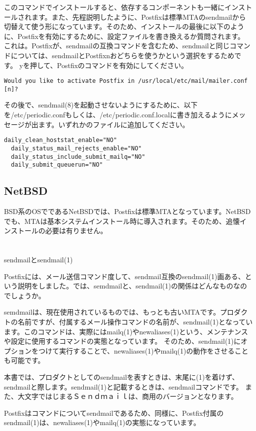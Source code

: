 このコマンドでインストールすると、依存するコンポーネントも一緒にインストールされます。また、先程説明したように、Postfixは標準MTAのsendmailから切替えて使う形になっています。そのため、インストールの最後に以下のように、Postfixを有効にするために、設定ファイルを書き換えるか質問されます。
これは。Postfixが、sendmailの互換コマンドを含むため、sendmailと同じコマンドについては、sendmailとPostfixnおどちらを使うかという選択をするためです。
yを押して、Postfixのコマンドを有効にしてください。

\begin{lstlisting}[basicstyle=\ttfamily\footnotesize, frame=single]
Would you like to activate Postfix in /usr/local/etc/mail/mailer.conf [n]?
\end{lstlisting}

その後で、sendmail(8)を起動させないようにするために、以下を/etc/periodic.confもしくは、/etc/periodic.conf.localに書き加えるようにメッセージが出ます。いずれかのファイルに追加してください。

\begin{lstlisting}[basicstyle=\ttfamily\footnotesize, frame=single]
  daily_clean_hoststat_enable="NO"
  daily_status_mail_rejects_enable="NO"
  daily_status_include_submit_mailq="NO"
  daily_submit_queuerun="NO"
\end{lstlisting}



\subsection{NetBSD}
BSD系のOSでであるNetBSDでは、Postfixは標準MTAとなっています。NetBSDでも、MTAは基本システムインストール時に導入されます。そのため、追懐インストールの必要は有りません。

\section*{}
\begin{itembox}[l]{sendmailとsendmail(1)}

Postfixには、メール送信コマンド度して、sendmail互換のsendmail(1)画ある、という説明をしました。では、semdmailと、sendmail(1)の関係はどんなものなのでしょうか。

semdmailは、現在使用されているものでは、もっとも古いMTAです。プロダクトの名前ですが、付属するメール操作コマンドの名前が、sendmail(1)となっています。このコマンドは、実際にはmailq(1)やnewaliases(1)という、メンテナンスや設定に使用するコマンドの実態となっています。
そのため、sendmail(1)にオプションをつけて実行することで、newaliases(1)やmailq(1)の動作をさせることも可能です。

本書では、プロダクトとしてのsendmailを表すときは、末尾に(1)を着けず、sendmailと際します。sendmail(1)と記載するときは、sendmailコマンドです。
また、大文字ではじまるＳｅｎｄｍａｉｌは、商用のバージョンとなります。

Postfixはコマンドについてsendmailであるため、同様に、Postfix付属のsendmail(1)は、newaliases(1)やmailq(1)の実態になっています。

\end{itembox}


